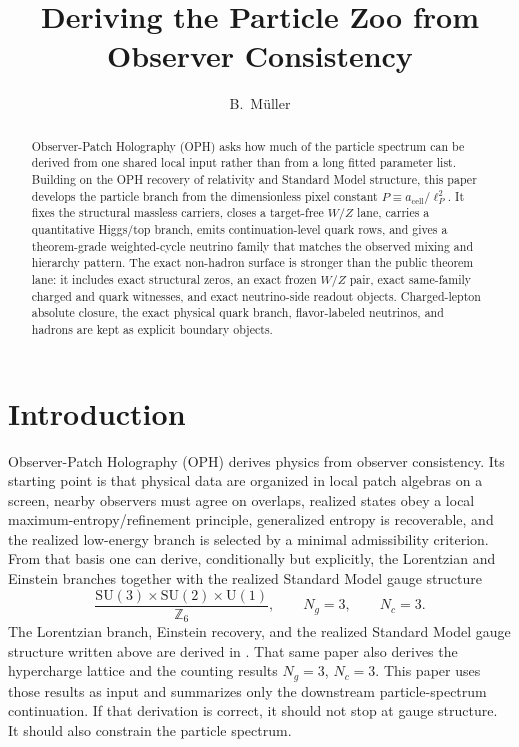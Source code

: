 \documentclass[11pt]{article}
\title{Deriving the Particle Zoo from\\
Observer Consistency}
\author{B.\ M\"uller}
\date{\OPHPaperReleaseDate}
\newcommand{\SU}{\mathrm{SU}}
\newcommand{\U}{\mathrm{U}}
\begin{document}
\maketitle
\OPHPaperReleaseBanner

\begin{abstract}
Observer-Patch Holography (OPH) asks how much of the particle spectrum can be derived from one shared local input rather than from a long fitted parameter list. Building on the OPH recovery of relativity and Standard Model structure, this paper develops the particle branch from the dimensionless pixel constant \(P \equiv a_{\mathrm{cell}}/\ell_P^2\). It fixes the structural massless carriers, closes a target-free \(W/Z\) lane, carries a quantitative Higgs/top branch, emits continuation-level quark rows, and gives a theorem-grade weighted-cycle neutrino family that matches the observed mixing and hierarchy pattern. The exact non-hadron surface is stronger than the public theorem lane: it includes exact structural zeros, an exact frozen \(W/Z\) pair, exact same-family charged and quark witnesses, and exact neutrino-side readout objects. Charged-lepton absolute closure, the exact physical quark branch, flavor-labeled neutrinos, and hadrons are kept as explicit boundary objects.
\end{abstract}

\section{Introduction}

Observer-Patch Holography (OPH) derives physics from observer consistency. Its
starting point is that physical data are organized in local patch algebras on a screen, nearby
observers must agree on overlaps, realized states obey a local maximum-entropy/refinement
principle, generalized entropy is recoverable, and the realized low-energy branch is selected by a
minimal admissibility criterion. From that basis one can derive, conditionally but explicitly, the
Lorentzian and Einstein branches together with the realized Standard Model gauge structure
\[
\frac{\SU(3)\times\SU(2)\times\U(1)}{\mathbb Z_6},
\qquad
N_g=3,
\qquad
N_c=3.
\]
The Lorentzian branch, Einstein recovery, and the realized Standard Model gauge structure written
above are derived in \cite{ophcompact}. That same paper also derives the hypercharge lattice and
the counting results \(N_g=3\), \(N_c=3\). This paper uses those results as input and summarizes only the
downstream particle-spectrum continuation. If that derivation is correct, it should not stop at gauge structure. It should also constrain the
particle spectrum.
\end{document}
